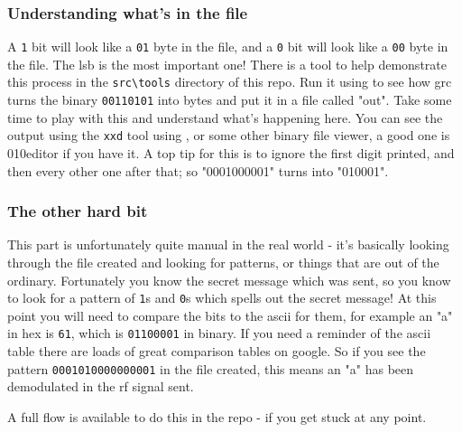 \subsubsection {Understanding what's in the file}
A \verb|1| bit  will look like a \verb|01| byte in the file, and a \verb|0| bit will look like a \verb|00| byte in the file. The \gls{lsb} is the most important one! There is a tool to help demonstrate this process in the \verb|src\tools| directory of this \gls{repo}. Run it using  to see how \gls{grc} turns the binary \verb|00110101| into bytes and put it in a file called "out". Take some time to play with this and understand what's happening here. You can see the output using the \verb|xxd| tool using , or some other binary file viewer, a good one is 010editor if you have it. A top tip for this is to ignore the first digit printed, and then every other one after that; so "0001000001" turns into "010001".

\subsubsection{The other hard bit}
This part is unfortunately quite manual in the real world - it's basically looking through the file created and looking for patterns, or things that are out of the ordinary. Fortunately you know the secret message which was sent, so you know to look for a pattern of \verb|1|s and \verb|0|s which spells out the secret message! At this point you will need to compare the bits to the \gls{ascii} for them, for example an "a" in hex is \verb|61|, which is \verb|01100001| in binary. If you need a reminder of the \gls{ascii} table there are loads of great comparison tables on google. So if you see the pattern \verb|0001010000000001| in the file created, this means an "a" has been demodulated in the \gls{rf} signal sent.

A full flow is available to do this in the \gls{repo} - if you get stuck at any point.

